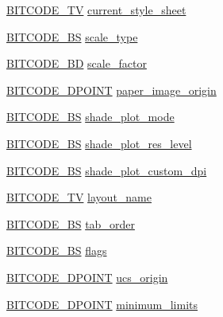 \begin{DoxyCompactItemize}
\hyperlink{dwg_8h_a2a7e040c6e36ca039b03608679ecaf7c}{\-B\-I\-T\-C\-O\-D\-E\-\_\-\-T\-V} \hyperlink{struct__dwg__object__LAYOUT_a27b989bb3896009b936abc68fc8cbd85}{current\-\_\-style\-\_\-sheet}
\item 
\hyperlink{dwg_8h_a94297606fbd4a4ff97e8add284af0809}{\-B\-I\-T\-C\-O\-D\-E\-\_\-\-B\-S} \hyperlink{struct__dwg__object__LAYOUT_af4434c566eb58a2cb5a7cbd962485625}{scale\-\_\-type}
\item 
\hyperlink{dwg_8h_a3c1e6781466b74ba07785d57da70ed97}{\-B\-I\-T\-C\-O\-D\-E\-\_\-\-B\-D} \hyperlink{struct__dwg__object__LAYOUT_ad4be978d61e356b7076fa8865470f156}{scale\-\_\-factor}
\item 
\hyperlink{dwg_8h_ab0367188e20f79ebcdabfe27d7fdf47c}{\-B\-I\-T\-C\-O\-D\-E\-\_\-D\-P\-O\-I\-N\-T} \hyperlink{struct__dwg__object__LAYOUT_adb9cae0518e4885feb9f17d99335894a}{paper\-\_\-image\-\_\-origin}
\item 
\hyperlink{dwg_8h_a94297606fbd4a4ff97e8add284af0809}{\-B\-I\-T\-C\-O\-D\-E\-\_\-\-B\-S} \hyperlink{struct__dwg__object__LAYOUT_a7337fad801b13c544e55376d40378b8d}{shade\-\_\-plot\-\_\-mode}
\item 
\hyperlink{dwg_8h_a94297606fbd4a4ff97e8add284af0809}{\-B\-I\-T\-C\-O\-D\-E\-\_\-\-B\-S} \hyperlink{struct__dwg__object__LAYOUT_ad82867b21b561a2f9adcda9ad8914310}{shade\-\_\-plot\-\_\-res\-\_\-level}
\item 
\hyperlink{dwg_8h_a94297606fbd4a4ff97e8add284af0809}{\-B\-I\-T\-C\-O\-D\-E\-\_\-\-B\-S} \hyperlink{struct__dwg__object__LAYOUT_ad8adb2692d8730ddb286252e12bb7921}{shade\-\_\-plot\-\_\-custom\-\_\-dpi}
\item 
\hyperlink{dwg_8h_a2a7e040c6e36ca039b03608679ecaf7c}{\-B\-I\-T\-C\-O\-D\-E\-\_\-\-T\-V} \hyperlink{struct__dwg__object__LAYOUT_a08d5adf0c18d93ee8aae1bb7e6b873f5}{layout\-\_\-name}
\item 
\hyperlink{dwg_8h_a94297606fbd4a4ff97e8add284af0809}{\-B\-I\-T\-C\-O\-D\-E\-\_\-\-B\-S} \hyperlink{struct__dwg__object__LAYOUT_a68f346fe12c9cf1087dff1b1fe4220a5}{tab\-\_\-order}
\item 
\hyperlink{dwg_8h_a94297606fbd4a4ff97e8add284af0809}{\-B\-I\-T\-C\-O\-D\-E\-\_\-\-B\-S} \hyperlink{struct__dwg__object__LAYOUT_ad405d2332f774d753d2407d6f153216e}{flags}
\item 
\hyperlink{dwg_8h_a28caf4c2afeb01c45b68490ea6d81113}{\-B\-I\-T\-C\-O\-D\-E\-\_\-D\-P\-O\-I\-N\-T} \hyperlink{struct__dwg__object__LAYOUT_a6f27f2b0ace905d846cb5624e65f6dba}{ucs\-\_\-origin}
\item 
\hyperlink{dwg_8h_ab0367188e20f79ebcdabfe27d7fdf47c}{\-B\-I\-T\-C\-O\-D\-E\-\_\-D\-P\-O\-I\-N\-T} \hyperlink{struct__dwg__object__LAYOUT_ab0515919e60f5fea13bea414cf57a347}{minimum\-\_\-limits}

\end{DoxyCompactItemize}
